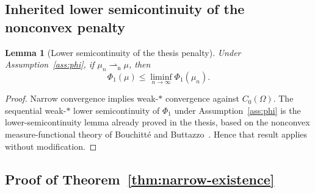 \documentclass[11pt]{amsart}
\newtheorem{lemma}[theorem]{Lemma}
\theoremstyle{definition}
\theoremstyle{remark}
\newcommand{\weakn}{\rightharpoonup_{\mathrm n}}
\begin{document}
\subsection{Inherited lower semicontinuity of the nonconvex penalty}

\begin{lemma}[Lower semicontinuity of the thesis penalty]
\label{lem:phi-lsc}
Under Assumption~\ref{ass:phi}, if $\mu_n\weakn\mu$, then
\[
  \Phi_1(\mu)
  \leq
  \liminf_{n\to\infty}\Phi_1(\mu_n).
\]
\end{lemma}

\begin{proof}
Narrow convergence implies weak-$*$ convergence against $C_0(\Omega)$.
The sequential weak-$*$ lower semicontinuity of $\Phi_1$ under
Assumption~\ref{ass:phi} is the lower-semicontinuity lemma already proved in
the thesis, based on the nonconvex measure-functional theory of
Bouchitt\'e and Buttazzo~\cite{bouchitte-buttazzo}.  Hence that result applies
without modification.
\end{proof}

\subsection{Proof of Theorem~\ref{thm:narrow-existence}}
\end{document}
